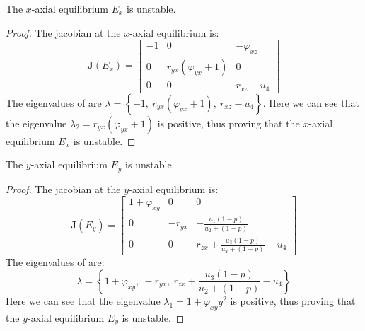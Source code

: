\begin{theorem}\label{thm:axial-x-stability}
    The $x$-axial equilibrium $E_x$ is unstable.
\end{theorem}
\begin{proof}
    The jacobian at the $x$-axial equilibrium is:
    \begin{equation}\label{matrix:jacobian-axial-x}
        \textbf{J}\left(E_x\right) = \begin{bmatrix}
            -1 & 0 & -\varphi_{xz}\\
            0 & r_{yx}\left(\varphi_{yx}+1\right) & 0\\
            0 & 0 & r_{xz}-u_4
        \end{bmatrix}
    \end{equation}
    The eigenvalues of  are $\lambda=\left\{-1,\ r_{yx}\left(\varphi_{yx}+1\right),\ r_{xz}-u_4\right\}$. Here we can see that the eigenvalue $\lambda_2=r_{yx}\left(\varphi_{yx}+1\right)$ is positive, thus proving that the $x$-axial equilibrium $E_x$ is unstable.
\end{proof}

\begin{theorem}\label{thm:axial-y-stability}
    The $y$-axial equilibrium $E_y$ is unstable.
\end{theorem}
\begin{proof}
    The jacobian at the $y$-axial equilibrium is:
    \begin{equation}\label{matrix:jacobian-axial-y}
        \textbf{J}\left(E_y\right) = \begin{bmatrix}
            1+\varphi_{xy} & 0 & 0\\
            0 & -r_{yx} & -\frac{u_1\left(1-p\right)}{u_2+\left(1-p\right)}\\
            0 & 0 & r_{zx}+\frac{u_3\left(1-p\right)}{u_2+\left(1-p\right)}-u_4
        \end{bmatrix}
    \end{equation}
    The eigenvalues of  are:
    \begin{equation*}
        \lambda=\left\{1+\varphi_{xy},\ -r_{yx},\ r_{zx}+\frac{u_3\left(1-p\right)}{u_2+\left(1-p\right)}-u_4\right\}
    \end{equation*}
    Here we can see that the eigenvalue $\lambda_1=1+\varphi_{xy}y^2$ is positive, thus proving that the $y$-axial equilibrium $E_y$ is unstable.
\end{proof}

